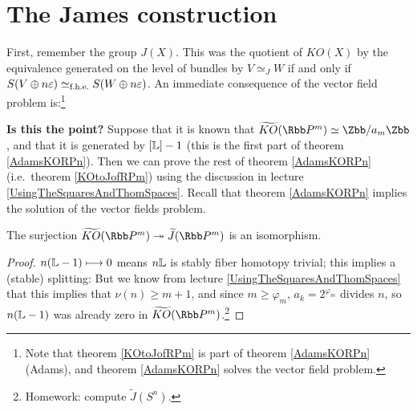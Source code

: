 

\section{The James construction} %
\label{TheJamesConstruction}
\ifx\OutputTheJamesConstruction\undefined\else
First, remember the group $J(X)$.  This was the quotient of $KO(X)$ by the equivalence generated on the level of bundles by $V \simeq_J W$ if and only if $S(V \oplus n \varepsilon) \simeq_\textup{f.h.e.} S(W \oplus n \varepsilon)$.  An immediate consequence of the vector field problem is:\footnote{Note that theorem \ref{KOtoJofRPm} is part of theorem \ref{AdamsKORPn} (Adams), and theorem \ref{AdamsKORPn} solves the vector field problem.}
\begin{ConfusedNote}
\textbf{Is this the point?}
Suppose that it is known that $\widetilde{KO}(\RP^m)\simeq\Zbb/a_m\Zbb$, and that it is generated by $[\mathbb{L}]-1$ (this is the first part of theorem \ref{AdamsKORPn}). Then we can prove the rest of theorem \ref{AdamsKORPn} (i.e.\ theorem \ref{KOtoJofRPm}) using the discussion in lecture \ref{UsingTheSquaresAndThomSpaces}. Recall that theorem \ref{AdamsKORPn} implies the solution of the vector fields problem.
\begin{thm} \label{KOtoJofRPm}
The surjection $\widetilde{KO}(\RP^m) \onto \widetilde J(\RP^m)$ is an isomorphism.
\end{thm}
\begin{proof}
$n(\mathbb{L} - 1) \longmapsto 0$ means $n \mathbb{L}$ is stably fiber homotopy trivial; this implies a (stable) splitting:
But we know from lecture \ref{UsingTheSquaresAndThomSpaces} that this implies that $\nu(n)\geq m+1$, and since $m\geq \varphi_m$, $a_k=2^{\varphi_m}$ divides $n$, so $n(\mathbb{L} - 1)$ was already zero in $\widetilde{KO}(\RP^m)$.\footnote{Homework: compute $\widetilde J(S^n)$.}
\end{proof}
\end{ConfusedNote}

